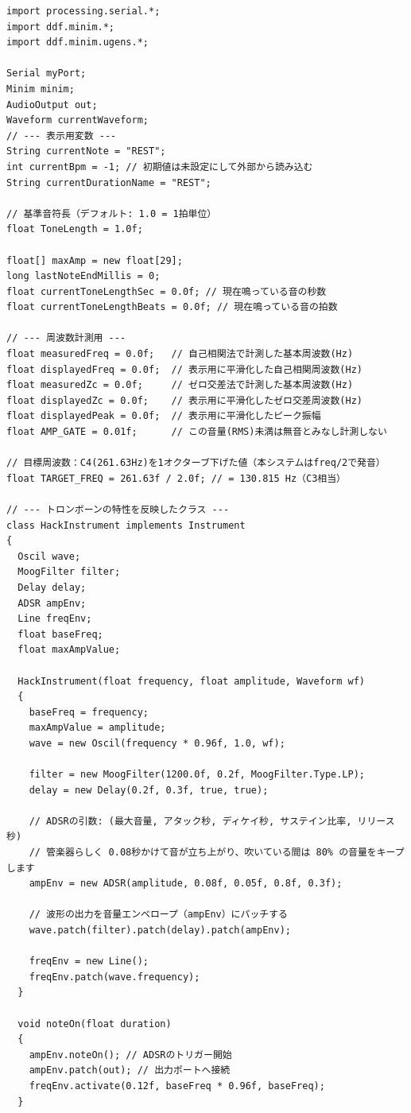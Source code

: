 \begin{lstlisting}
import processing.serial.*;
import ddf.minim.*;
import ddf.minim.ugens.*;

Serial myPort;
Minim minim;
AudioOutput out;
Waveform currentWaveform;
// --- 表示用変数 ---
String currentNote = "REST";
int currentBpm = -1; // 初期値は未設定にして外部から読み込む
String currentDurationName = "REST";

// 基準音符長（デフォルト: 1.0 = 1拍単位）
float ToneLength = 1.0f;

float[] maxAmp = new float[29];
long lastNoteEndMillis = 0;
float currentToneLengthSec = 0.0f; // 現在鳴っている音の秒数
float currentToneLengthBeats = 0.0f; // 現在鳴っている音の拍数

// --- 周波数計測用 ---
float measuredFreq = 0.0f;   // 自己相関法で計測した基本周波数(Hz)
float displayedFreq = 0.0f;  // 表示用に平滑化した自己相関周波数(Hz)
float measuredZc = 0.0f;     // ゼロ交差法で計測した基本周波数(Hz)
float displayedZc = 0.0f;    // 表示用に平滑化したゼロ交差周波数(Hz)
float displayedPeak = 0.0f;  // 表示用に平滑化したピーク振幅
float AMP_GATE = 0.01f;      // この音量(RMS)未満は無音とみなし計測しない

// 目標周波数：C4(261.63Hz)を1オクターブ下げた値（本システムはfreq/2で発音）
float TARGET_FREQ = 261.63f / 2.0f; // = 130.815 Hz（C3相当）

// --- トロンボーンの特性を反映したクラス ---
class HackInstrument implements Instrument
{
  Oscil wave;
  MoogFilter filter; 
  Delay delay;
  ADSR ampEnv;
  Line freqEnv;
  float baseFreq;
  float maxAmpValue;

  HackInstrument(float frequency, float amplitude, Waveform wf)
  {
    baseFreq = frequency;
    maxAmpValue = amplitude;
    wave = new Oscil(frequency * 0.96f, 1.0, wf);

    filter = new MoogFilter(1200.0f, 0.2f, MoogFilter.Type.LP);
    delay = new Delay(0.2f, 0.3f, true, true);

    // ADSRの引数: (最大音量, アタック秒, ディケイ秒, サステイン比率, リリース秒)
    // 管楽器らしく 0.08秒かけて音が立ち上がり、吹いている間は 80% の音量をキープします
    ampEnv = new ADSR(amplitude, 0.08f, 0.05f, 0.8f, 0.3f);
    
    // 波形の出力を音量エンベロープ（ampEnv）にパッチする
    wave.patch(filter).patch(delay).patch(ampEnv);
    
    freqEnv = new Line();
    freqEnv.patch(wave.frequency);
  }

  void noteOn(float duration)
  {
    ampEnv.noteOn(); // ADSRのトリガー開始
    ampEnv.patch(out); // 出力ポートへ接続
    freqEnv.activate(0.12f, baseFreq * 0.96f, baseFreq);
  }


\end{lstlisting}
